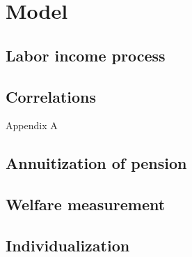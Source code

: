 \chapter{Model}
\label{model}

\section{Labor income process}
\section{Correlations}
Appendix A
\section{Annuitization of pension}
\section{Welfare measurement}
\section{Individualization}

